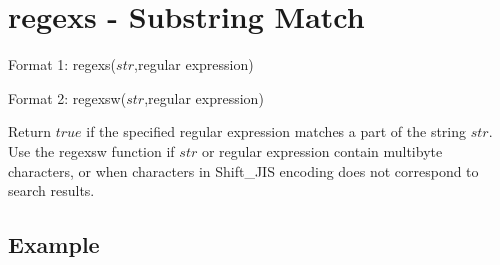 
%

\section{regexs - Substring Match\label{sect:regexs}}

Format 1: regexs($str$,regular expression)

Format 2: regexsw($str$,regular expression)

Return $true$ if the specified regular expression matches a part of the string $str$. Use the regexsw function if  $str$ or regular expression contain multibyte characters, or when characters in Shift\_JIS encoding does not correspond to search results. 

\subsection*{Example}


%

